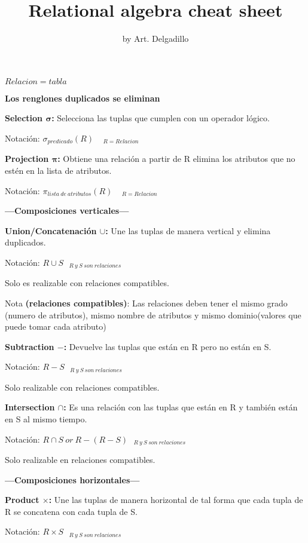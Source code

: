 \documentclass{article}
\begin{document}
\title{Relational algebra cheat sheet}
\author{by Art. Delgadillo}
\maketitle

$Relacion=tabla$

\textbf{Los renglones duplicados se eliminan}

\textbf{Selection $\mathbf{\sigma}$:} Selecciona las tuplas que cumplen con un operador lógico.

Notación: $ \sigma _{predicado}(R)\ \ \ \ \ _{R=Relacion}$

\textbf{Projection $\mathbf{\pi}$:} Obtiene una relación a partir de R elimina los atributos que no estén en la lista de atributos.

Notación: $\pi _{lista\ de\ atributos}(R)\ \ \ \ \ _{R=Relacion}$

\vspace{5mm}
\centerline{\textbf{---Composiciones verticales---}}

\textbf{Union/Concatenación $\cup$:} Une las tuplas de manera vertical y elimina duplicados.

Notación: $R\cup S\ \ \ _{R\ y\ S\ son\ relaciones}$

Solo es realizable con relaciones compatibles.

Nota \textbf{(relaciones compatibles)}: Las relaciones deben tener el mismo grado (numero de atributos), mismo nombre de atributos y mismo dominio(valores que puede tomar cada atributo)


\textbf{Subtraction $-$:} Devuelve las tuplas que están en R pero no están en S.


Notación: $R-S\ \ \ _{R\ y\ S\ son\ relaciones}$

Solo realizable con relaciones compatibles.

\textbf{Intersection $\cap$:} Es una relación con las tuplas que están en R y también están en S al mismo tiempo.

Notación: $R\cap S\ or\ R-(R-S)\ \ \ _{R\ y\ S\ son\ relaciones}$

Solo realizable en relaciones compatibles.

\pagebreak
\centerline{\textbf{---Composiciones horizontales---}}

\textbf{Product $\times$:} Une las tuplas de manera horizontal de tal forma que cada tupla de R se concatena con cada tupla de S.

Notación: $R\times S\ \ \ _{R\ y\ S\ son\ relaciones}$
\end{document}
